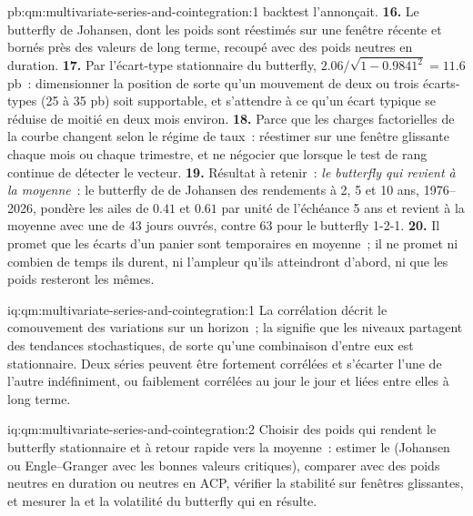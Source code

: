 \begin{solution}{pb:qm:multivariate-series-and-cointegration:1}
backtest l'annonçait.
\textbf{16.} Le butterfly de Johansen, dont les poids sont réestimés sur une fenêtre récente et bornés près des valeurs de long terme, recoupé avec des poids neutres en duration.
\textbf{17.} Par l'écart-type stationnaire du butterfly, $2.06/\sqrt{1 - 0.9841^2} = 11.6$ pb~: dimensionner la position de sorte qu'un mouvement de deux ou trois écarts-types
(25 à 35 pb) soit supportable, et s'attendre à ce qu'un écart typique se réduise de moitié en deux mois environ.
\textbf{18.} Parce que les charges factorielles de la courbe changent selon le régime de taux~: réestimer sur une fenêtre glissante chaque mois ou chaque trimestre, et ne négocier que lorsque le test de rang
continue de détecter le vecteur.
\textbf{19.} Résultat à retenir~: \emph{le butterfly qui revient à la moyenne}~: le butterfly de  de Johansen des rendements à 2, 5 et 10 ans, 1976--2026, pondère les ailes de $0.41$ et $0.61$ par
unité de l'échéance 5 ans et revient à la moyenne avec une  de 43 jours ouvrés, contre 63 pour le butterfly 1-2-1.
\textbf{20.} Il promet que les écarts d'un panier sont temporaires en moyenne~; il ne promet ni combien de temps ils durent, ni l'ampleur qu'ils atteindront d'abord, ni que les poids resteront
les mêmes.
\end{solution}

\begin{solution}{iq:qm:multivariate-series-and-cointegration:1}
La corrélation décrit le comouvement des variations sur un horizon~; la  signifie que les niveaux partagent des tendances stochastiques, de sorte qu'une combinaison d'entre eux est stationnaire. Deux
séries peuvent être fortement corrélées et s'écarter l'une de l'autre indéfiniment, ou faiblement corrélées au jour le jour et liées entre elles à long terme.
\end{solution}

\begin{solution}{iq:qm:multivariate-series-and-cointegration:2}
Choisir des poids qui rendent le butterfly stationnaire et à retour rapide vers la moyenne~: estimer le  (Johansen ou Engle--Granger avec les bonnes valeurs critiques),
comparer avec des poids neutres en duration ou neutres en ACP, vérifier la stabilité sur fenêtres glissantes, et mesurer la  et la volatilité du butterfly qui en résulte.
\end{solution}

